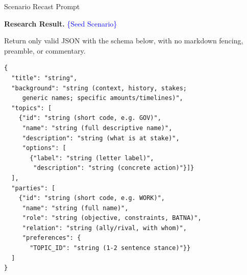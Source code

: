 \begin{table}[p]
\begin{promptbox}{Scenario Recast Prompt}
\begin{userbox}
\scriptsize
\textbf{Research Result.} \textcolor{blue}{\{Seed Scenario\}}

\smallskip
Return only valid JSON with the schema below, with no markdown fencing, preamble, or commentary.
\begin{verbatim}
{
  "title": "string",
  "background": "string (context, history, stakes;
     generic names; specific amounts/timelines)",
  "topics": [
    {"id": "string (short code, e.g. GOV)",
     "name": "string (full descriptive name)",
     "description": "string (what is at stake)",
     "options": [
       {"label": "string (letter label)",
        "description": "string (concrete action)"}]}
  ],
  "parties": [
    {"id": "string (short code, e.g. WORK)",
     "name": "string (full name)",
     "role": "string (objective, constraints, BATNA)",
     "relation": "string (ally/rival, with whom)",
     "preferences": {
       "TOPIC_ID": "string (1-2 sentence stance)"}}
  ]
}
\end{verbatim}
\end{userbox}
\end{promptbox}
\vspace{-0.25cm}
\caption{Prompt for scenario recast.}
\vspace{-0.3cm}
\label{tab:prompt-scenario}
\end{table}
\clearpage


